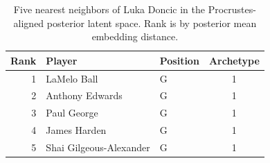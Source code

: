 \begin{table}[htbp]
  \centering\small
  \begin{tabular}{rllc}
    \toprule
    Rank & Player & Position & Archetype \\
    \midrule
    1 & LaMelo Ball & G & 1 \\
    2 & Anthony Edwards & G & 1 \\
    3 & Paul George & G & 1 \\
    4 & James Harden & G & 1 \\
    5 & Shai Gilgeous-Alexander & G & 1 \\
    \bottomrule
  \end{tabular}
  \caption{Five nearest neighbors of Luka Doncic in the Procrustes-aligned posterior latent space. Rank is by posterior mean embedding distance.}
  \label{tab:Luka_Doncic_neighbors}
\end{table}

